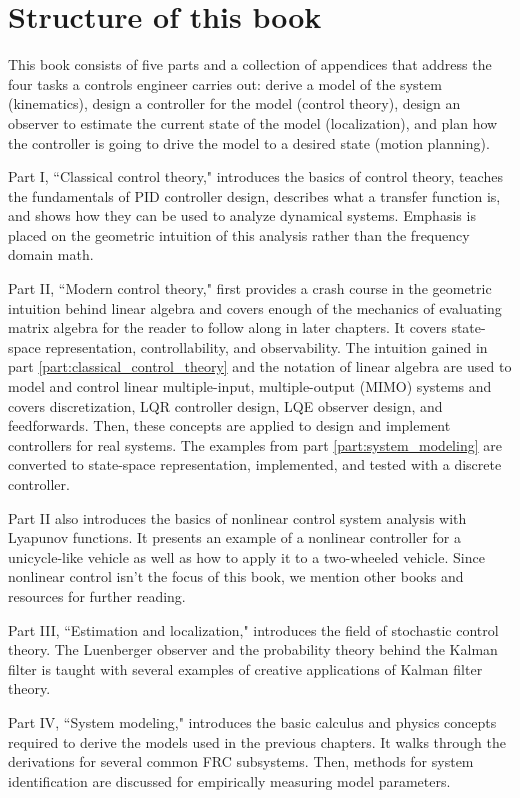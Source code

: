 \section{Structure of this book}

This book consists of five parts and a collection of appendices that address the
four tasks a controls engineer carries out: derive a model of the system
(kinematics), design a controller for the model (control theory), design an
observer to estimate the current state of the model (localization), and plan how
the controller is going to drive the model to a desired state (motion planning).

Part I, ``Classical control theory," introduces the basics of control theory,
teaches the fundamentals of PID controller design, describes what a transfer
function is, and shows how they can be used to analyze dynamical systems.
Emphasis is placed on the geometric intuition of this analysis rather than the
frequency domain math.

Part II, ``Modern control theory," first provides a crash course in the
geometric intuition behind linear algebra and covers enough of the mechanics of
evaluating matrix algebra for the reader to follow along in later chapters. It
covers state-space representation, controllability, and observability. The
intuition gained in part \ref{part:classical_control_theory} and the notation of
linear algebra are used to model and control linear multiple-input,
multiple-output (MIMO) systems and covers discretization, LQR controller design,
LQE observer design, and feedforwards. Then, these concepts are applied to
design and implement controllers for real systems. The examples from part
\ref{part:system_modeling} are converted to state-space representation,
implemented, and tested with a discrete controller.

Part II also introduces the basics of nonlinear control system analysis with
Lyapunov functions. It presents an example of a nonlinear controller for a
unicycle-like vehicle as well as how to apply it to a two-wheeled vehicle. Since
nonlinear control isn't the focus of this book, we mention other books and
resources for further reading.

Part III, ``Estimation and localization," introduces the field of stochastic
control theory. The Luenberger observer and the probability theory behind the
Kalman filter is taught with several examples of creative applications of Kalman
filter theory.

Part IV, ``System modeling," introduces the basic calculus and physics concepts
required to derive the models used in the previous chapters. It walks through
the derivations for several common FRC subsystems. Then, methods for system
identification are discussed for empirically measuring model parameters.

